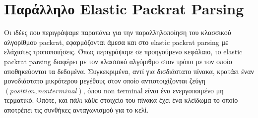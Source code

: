 \section{Παράλληλο Elastic Packrat Parsing}
Οι ιδέες που περιγράψαμε παραπάνω για την παραλληλοποίηση του κλασσικού αλγορίθμου packrat, εφαρμόζονται άμεσα και στο elastic packrat parsing με ελάχιστες τροποποιήσεις.
Όπως περιγράψαμε σε προηγούμενο κεφάλαιο, το elastic packrat parsing διαφέρει με τον κλασσικό αλγόριθμο στον τρόπο με τον οποίο αποθηκεύονται τα δεδομένα.
Συγκεκριμένα, αντί για δισδιάστατο πίνακα, κρατάει έναν μονοδιάστατο μικρότερου μεγέθους στον οποίο αντιστοιχίζονται ζεύγη $(position, non terminal)$, όπου non terminal είναι ένα ενεργοποιμένο μη τερματικό.
Οπότε, και πάλι κάθε στοιχείο του πίνακα έχει ένα κλείδωμα το οποίο αποτρέπει τις συνθήκες ανταγωνισμού για το κελί.


